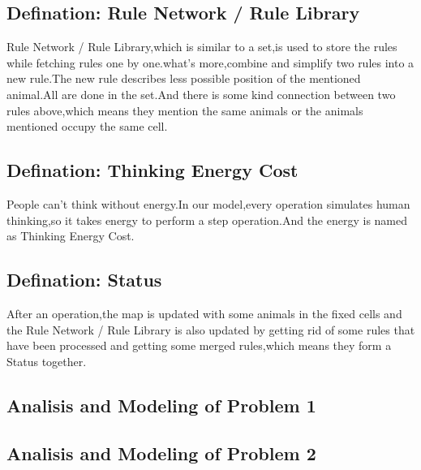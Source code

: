 \documentclass[12pt,a4paper,]{article}
\begin{document}
\subsection{Defination: Rule Network / Rule Library}
Rule Network / Rule Library,which is similar to a set,is used to store the rules while fetching rules one by one.what's more,combine and simplify two rules  into a new rule.The new rule describes less possible position of the mentioned animal.All are done in the set.And there is some kind connection between two rules above,which means they mention the same animals or the animals mentioned occupy the same cell.
\subsection{Defination: Thinking Energy Cost}
 People can't think without energy.In our model,every operation simulates human thinking,so it takes energy to perform a step operation.And the energy is named as Thinking Energy Cost.
\subsection{Defination: Status}
After an operation,the map is updated with some animals in the fixed cells and the Rule Network / Rule Library is also updated by getting rid of some rules that have been processed and  getting some merged rules,which means they form a Status together.



\subsection{Analisis and Modeling of Problem 1}


\subsection{Analisis and Modeling of Problem 2}
\end{document}
